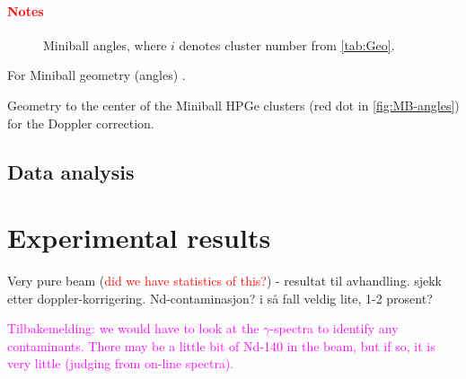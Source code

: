 \documentclass[twoside,english]{uiofysmaster/uiofysmaster}
\newcommand{\ga}{$\gamma$}
\begin{document}
\subsubsection*{\textcolor{red}{Notes}}



\bigskip

\begin{figure}[ht]
	\centering
	
	\caption{Miniball angles, where $i$ denotes cluster number from \autoref{tab:Geo}.}
	\label{fig:MB-angles}
\end{figure}

For Miniball geometry (angles) \cite{NWarr-Angles}. 

\begin{table}[ht] 
	\centering 
	\caption{Geometry to the center of the Miniball HPGe clusters (red dot in \autoref{fig:MB-angles}) for the Doppler correction.}
	
	\label{tab:Geo}
\end{table}




\section{Data analysis}











\chapter{Experimental results}


Very pure beam (\textcolor{red}{did we have statistics of this?}) - resultat til avhandling. sjekk etter doppler-korrigering. Nd-contaminasjon? i så fall veldig lite, 1-2 prosent?

\textcolor{Magenta}{Tilbakemelding: \newline
we would have to look at the \ga-spectra to identify any contaminants. There may be a little bit of Nd-140 in the beam, but if so, it is very little (judging from on-line spectra).}


\end{document}
